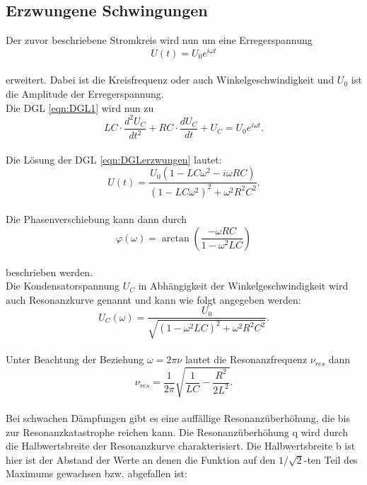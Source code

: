\subsection{Erzwungene Schwingungen}
Der zuvor beschriebene Stromkreis wird nun um eine Erregerspannung
\begin{equation}
  U(t) = U_{0} e^{i \omega t}
\end{equation}
\\erweitert. Dabei ist \omega die Kreisfrequenz oder auch Winkelgeschwindigkeit und $U_{0}$ ist die Amplitude der Erregerspannung.
\\Die DGL \eqref{eqn:DGL1} wird nun zu
\begin{equation}
    LC \cdot \frac{d^2 U_{C}}{dt^2} + RC \cdot \frac{d U_{C}}{dt} + U_{C} = U_{0} e^{i \omega t}.
  \label{eqn:DGLerzwungen}
\end{equation}
\\Die Lösung der DGL \eqref{eqn:DGLerzwungen} lautet:
\begin{equation*}
  U(t) = \frac{U_{0}(1-LC \omega^2 - i \omega RC)}{(1- LC \omega^2)^2 + \omega^2 R^2 C^2}.
\end{equation*}
\\Die Phasenverschiebung \varphi kann dann durch
\begin{equation}
  \varphi (\omega) = \arctan{ \left( \frac{- \omega R C}{1- \omega^2 L C} \right) }
  \label{eqn:varphi}
\end{equation}
\\beschrieben werden.
\\Die Kondensatorspannung $U_{C}$ in Abhängigkeit der Winkelgeschwindigkeit \omega wird auch Resonanzkurve genannt und kann wie folgt angegeben werden:
\begin{equation*}
  U_{C}(\omega)= \frac{U_{0}}{\sqrt{\left( 1-\omega^2 LC \right)^2 + \omega^2 R^2 C^2}}.
\end{equation*}
\\Unter Beachtung der Beziehung $\omega=2 \pi \nu$ lautet die Resonanzfrequenz $\nu_{res}$ dann
\begin{equation}
  \nu_{res}= \frac{1}{2 \pi} \sqrt{\frac{1}{LC} - \frac{R^2}{2L^2} }.
  \label{eqn:nuresonanz}
\end{equation}
\\Bei schwachen Dämpfungen gibt es eine auffällige Resonanzüberhöhung, die bis zur Resonanzkatastrophe reichen kann.
Die Resonanzüberhöhung q wird durch die Halbwertsbreite der Resonanzkurve charakterisiert.
Die Halbwertsbreite b ist hier ist der Abstand der Werte an denen die Funktion auf den $1/\sqrt{2}$-ten Teil des Maximums gewachsen bzw. abgefallen ist:
